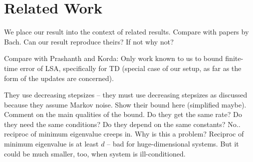 \section{Related Work}
\label{sec:related}
We place our result into the context of related results.
Compare with papers by Bach. Can our result reproduce theirs?
If not why not? 

Compare with Prashanth and Korda:
Only work known to us to bound finite-time error of LSA,
specifically for TD (special case of our setup,
as far as the form of the updates are concerned).

They use decreasing stepsizes -- they must use decreasing stepsizes
as discussed because they assume Markov noise.
Show their bound here (simplified maybe).
Comment on the main qualities of the bound.
Do they get the same rate?
Do they need the same conditions?
Do they depend on the same constants? No.. reciproc of minimum eigenvalue creeps in.
Why is this a problem? Reciproc of minimum eigenvalue is at least $d$ -- bad for huge-dimensional systems.
But it could be much smaller, too, when system is ill-conditioned.
